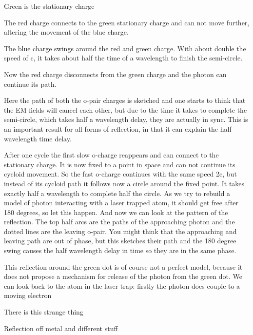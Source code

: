 Green is the stationary charge

The red charge connects to the green stationary charge and can not move further, altering the movement of the blue charge.



The blue charge swings around the red and green charge. With about double the speed of c, it takes about half the time of a wavelength to finish the semi-circle.

Now the red charge disconnects from the green charge and the photon can continue its path.






Here the path of both the o-pair charges is sketched and one starts to think that the EM fields will cancel each other, but due to the time it takes to complete the semi-circle, which takes half a wavelength delay, they are actually in sync. This is an important result for all forms of reflection, in that it can explain the half wavelength time delay.

After one cycle the first slow o-charge reappears and can connect to the stationary charge. It is now fixed to a point in space and can not continue its cycloid movement. So the fast o-charge continues with the same speed 2c, but instead of its cycloid path it follows now a circle around the fixed point. It takes exactly half a wavelength to complete half the circle.
As we try to rebuild a model of photon interacting with a laser trapped atom, it should get free after 180 degrees, so let this happen. And now we can look at the pattern of the reflection. The top half arcs are the paths of the approaching photon and the dotted lines are the leaving o-pair. You might think that the approaching and leaving path are out of phase, but this sketches their path and the 180 degree swing causes the half wavelength delay in time so they are in the same phase.

This reflection around the green dot is of course not a perfect model, because it does not propose a mechanism for release of the photon from the green dot. We can look back to the atom in the laser trap: firstly the photon does couple to a moving electron

There is this strange thing





Reflection off metal and different stuff

